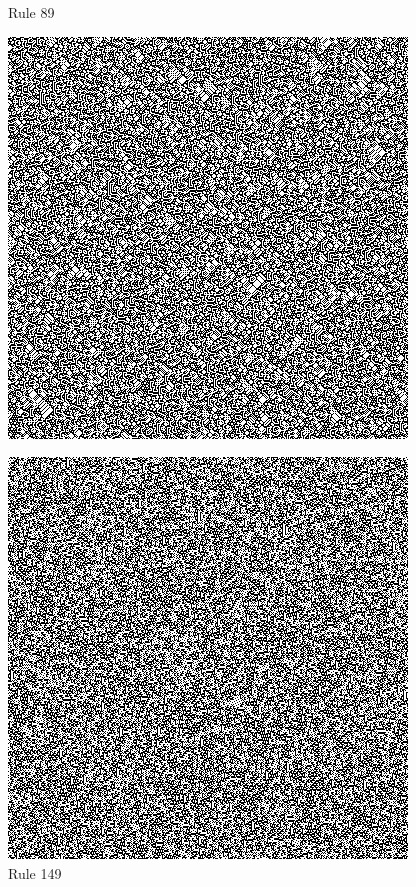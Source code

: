 \documentclass{article}
\begin{document}
\begin{figure}[H]
  \begin{center}
    \begin{minipage}{0.48\textwidth}
      \caption{Rule 89}
      \label{fig:figure6}
      \centering
      \includegraphics[scale=.5]{89.png}
    \end{minipage}
    \begin{minipage}{0.48\textwidth}
      \caption{Rule 149}
      \label{fig:figure7}
      \centering
      \includegraphics[scale=.5]{149.png}
    \end{minipage}
  \end{center}
\end{figure}
\end{document}
